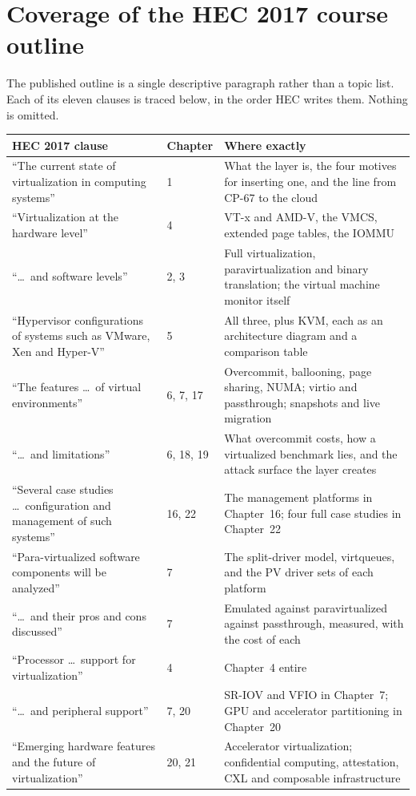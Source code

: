 \section*{Coverage of the HEC 2017 course outline}

The published outline is a single descriptive paragraph rather than a topic
list. Each of its eleven clauses is traced below, in the order HEC writes them.
Nothing is omitted.

\begin{longtable}{@{}L{6.4cm}L{2.0cm}L{6.6cm}@{}}
\toprule
{}
\textbf{HEC 2017 clause} & \textbf{Chapter} & \textbf{Where exactly} \\
\midrule
\endhead
``The current state of virtualization in computing systems'' & 1 & What the
layer is, the four motives for inserting one, and the line from CP-67 to the
cloud \\
``Virtualization at the hardware level'' & 4 & VT-x and AMD-V, the VMCS,
extended page tables, the IOMMU \\
``\ldots\ and software levels'' & 2, 3 & Full virtualization, paravirtualization
and binary translation; the virtual machine monitor itself \\
``Hypervisor configurations of systems such as VMware, Xen and Hyper-V'' & 5 &
All three, plus KVM, each as an architecture diagram and a comparison table \\
``The features \ldots\ of virtual environments'' & 6, 7, 17 & Overcommit,
ballooning, page sharing, NUMA; virtio and passthrough; snapshots and live
migration \\
``\ldots\ and limitations'' & 6, 18, 19 & What overcommit costs, how a
virtualized benchmark lies, and the attack surface the layer creates \\
``Several case studies \ldots\ configuration and management of such systems'' &
16, 22 & The management platforms in Chapter~16; four full case studies in
Chapter~22 \\
``Para-virtualized software components will be analyzed'' & 7 & The split-driver
model, virtqueues, and the PV driver sets of each platform \\
``\ldots\ and their pros and cons discussed'' & 7 & Emulated against
paravirtualized against passthrough, measured, with the cost of each \\
``Processor \ldots\ support for virtualization'' & 4 & Chapter~4 entire \\
``\ldots\ and peripheral support'' & 7, 20 & SR-IOV and VFIO in Chapter~7; GPU
and accelerator partitioning in Chapter~20 \\
``Emerging hardware features and the future of virtualization'' & 20, 21 &
Accelerator virtualization; confidential computing, attestation, CXL and
composable infrastructure \\
\bottomrule
\end{longtable}

